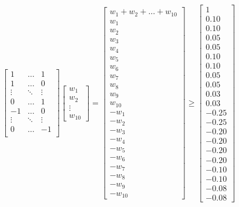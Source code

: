\documentclass[12pt,]{book}
\begin{document}
\[ \begin{bmatrix} 1 & \dots & 1 \\ 1 & \dots & 0 \\ \vdots &  \ddots & \vdots \\
0 & \dots & 1 \\ -1 & \dots & 0 \\ \vdots & \ddots & \vdots \\
0 & \dots & -1 \\ \end{bmatrix}
\begin{bmatrix} w_1 \\ w_2 \\ \vdots \\ w_{10} \end{bmatrix} 
= \begin{bmatrix} w_1 + w_2 + \dots + w_{10} \\ w_1 \\ w_2 \\ w_3 \\ w_4 \\ w_5 \\ w_6 \\
w_7\\ w_8\\ w_9\\ w_{10} \\ -w_1 \\ -w_2 \\ -w_3 \\ -w_4 \\ -w_5 \\ -w_6 \\ -w_7 \\ -w_8 \\ -w_9 \\ -w_{10}
\end{bmatrix} \ge \begin{bmatrix} 1 \\ 0.10 \\ 0.10 \\ 0.05 \\ 0.05 \\ 0.10 \\ 0.10 \\ 0.05 \\ 0.05 \\ 0.03 \\ 0.03 \\ -0.25 \\ -0.25 \\ -0.20 \\ -0.20 \\ -0.20 \\ -0.20 \\ -0.10 \\ -0.10 \\ -0.08 \\ -0.08
\end{bmatrix} \]
\end{document}
